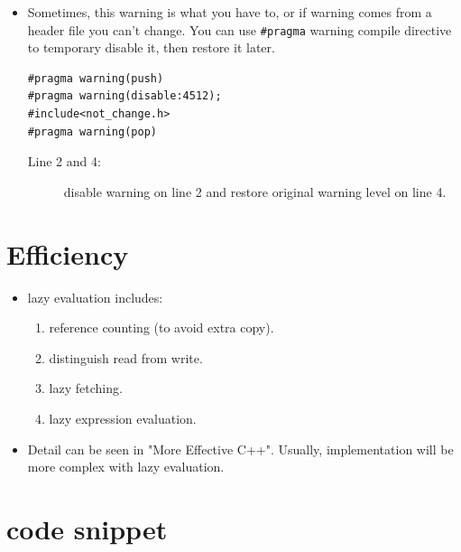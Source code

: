 \documentclass[a4paper,11pt,twoside]{book}
\begin{document}
\begin{itemize}
	\item Sometimes, this warning is what you have to, or if warning comes from a header file you can't change. You can use \texttt{\#pragma} warning compile directive to temporary disable it, then restore it later.
\begin{lstlisting}[numbers=none]
#pragma warning(push)
#pragma warning(disable:4512);
#include<not_change.h>
#pragma warning(pop)
\end{lstlisting}
\begin{description}
	\item[Line 2 and 4:] disable warning on line 2 and restore original warning level on line 4.
\end{description}
	
\end{itemize}

\section{Efficiency}
\begin{itemize}
	\item  lazy evaluation includes:
	\begin{enumerate}
		\item reference counting (to avoid extra copy).
		\item distinguish read from write.
		\item lazy fetching.
		\item lazy expression evaluation.
	\end{enumerate}
	\item Detail can be seen in "More Effective C++". Usually, implementation will be  more complex with lazy evaluation.
\end{itemize}


\section{code snippet}
\end{document}
